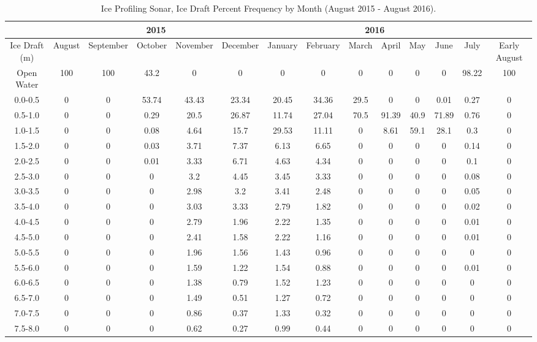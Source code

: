 \documentclass[12pt]{dforeport}
\begin{document}
\begin{landscape}
\begin{table}[ht]
\centering
\caption[Ice Draft Percent Frequency]{Ice Profiling Sonar, Ice Draft Percent Frequency by Month (August 2015 - August 2016).}
\label{t:ids_pf_2015_2016}
\begin{tabular}{c | c c c c c | c c c c c c c c}
\toprule
& \multicolumn{5}{c}{\textbf{2015}} & \multicolumn{7}{c}{\textbf{2016}} \\
\midrule
Ice Draft (m) & August & September & October & November & December & January & February & March & April & May & June & July & Early August \\ 
\midrule
Open Water & 100 & 100 & 43.2 & 0 & 0 & 0 & 0 & 0 & 0 & 0 & 0 & 98.22 & 100 \\
0.0-0.5 & 0 & 0 & 53.74 & 43.43 & 23.34 & 20.45 & 34.36 & 29.5 & 0 & 0 & 0.01 & 0.27 & 0 \\
0.5-1.0 & 0 & 0 & 0.29 & 20.5 & 26.87 & 11.74 & 27.04 & 70.5 & 91.39 & 40.9 & 71.89 & 0.76 & 0 \\
1.0-1.5 & 0 & 0 & 0.08 & 4.64 & 15.7 & 29.53 & 11.11 & 0 & 8.61 & 59.1 & 28.1 & 0.3 & 0 \\
1.5-2.0 & 0 & 0 & 0.03 & 3.71 & 7.37 & 6.13 & 6.65 & 0 & 0 & 0 & 0 & 0.14 & 0 \\
2.0-2.5 & 0 & 0 & 0.01 & 3.33 & 6.71 & 4.63 & 4.34 & 0 & 0 & 0 & 0 & 0.1 & 0 \\
2.5-3.0 & 0 & 0 & 0 & 3.2 & 4.45 & 3.45 & 3.33 & 0 & 0 & 0 & 0 & 0.08 & 0 \\
3.0-3.5 & 0 & 0 & 0 & 2.98 & 3.2 & 3.41 & 2.48 & 0 & 0 & 0 & 0 & 0.05 & 0 \\
3.5-4.0 & 0 & 0 & 0 & 3.03 & 3.33 & 2.79 & 1.82 & 0 & 0 & 0 & 0 & 0.02 & 0 \\
4.0-4.5 & 0 & 0 & 0 & 2.79 & 1.96 & 2.22 & 1.35 & 0 & 0 & 0 & 0 & 0.01 & 0 \\
4.5-5.0 & 0 & 0 & 0 & 2.41 & 1.58 & 2.22 & 1.16 & 0 & 0 & 0 & 0 & 0.01 & 0 \\
5.0-5.5 & 0 & 0 & 0 & 1.96 & 1.56 & 1.43 & 0.96 & 0 & 0 & 0 & 0 & 0 & 0 \\
5.5-6.0 & 0 & 0 & 0 & 1.59 & 1.22 & 1.54 & 0.88 & 0 & 0 & 0 & 0 & 0.01 & 0 \\
6.0-6.5 & 0 & 0 & 0 & 1.38 & 0.79 & 1.52 & 1.23 & 0 & 0 & 0 & 0 & 0 & 0 \\
6.5-7.0 & 0 & 0 & 0 & 1.49 & 0.51 & 1.27 & 0.72 & 0 & 0 & 0 & 0 & 0 & 0 \\
7.0-7.5 & 0 & 0 & 0 & 0.86 & 0.37 & 1.33 & 0.32 & 0 & 0 & 0 & 0 & 0 & 0 \\
7.5-8.0 & 0 & 0 & 0 & 0.62 & 0.27 & 0.99 & 0.44 & 0 & 0 & 0 & 0 & 0 & 0 \\

\end{tabular}
\end{table}
\end{landscape}
\end{document}
